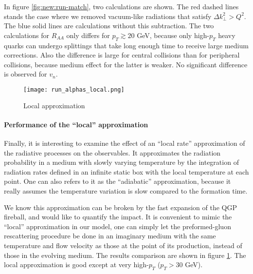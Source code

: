In figure \ref{fig:new:run-match}, two calculations are shown. 
The red dashed lines stands the case where we removed vacuum-like radiations that satisfy $\Delta k_\perp^2 > Q^2$.
The blue solid lines are calculations without this subtraction.
The two calculations for $R_{AA}$ only differs for $p_T\gtrsim 20$ GeV, because only high-$p_T$ heavy quarks can undergo splittings that take long enough time to receive large medium corrections.
Also the difference is large for central collisions than for peripheral collisions, because medium effect for the latter is weaker.
No significant difference is observed for $v_n$.

\begin{figure}
\centering
\texttt{[image: run\_alphas\_local.png]}
\caption{Local approximation}
\label{fig:new:run-local}
\end{figure}

\paragraph{Performance of the ``local'' approximation}
Finally, it is interesting to examine the effect of an ``local rate'' approximation of the radiative processes on the observables.
It approximates the radiation probability in a medium with slowly varying temperature by the integration of radiation rates defined in an infinite static box with the local temperature at each point.
One can also refers to it as the ``adiabatic'' approximation, because it really assumes the temperature variation is slow compared to the formation  time.

We know this approximation can be broken by the fast expansion of the QGP fireball, and would like to quantify the impact.
It is convenient to mimic the ``local'' approximation in our model, one can simply let the preformed-gluon rescattering procedure be done in an imaginary medium with the same temperature and flow velocity as those at the point of its production, instead of those in the evolving medium.
The results comparison are shown in figure \ref{fig:new:run-local}.
The local approximation is good except at very high-$p_T$ ($p_T > 30$ GeV).

